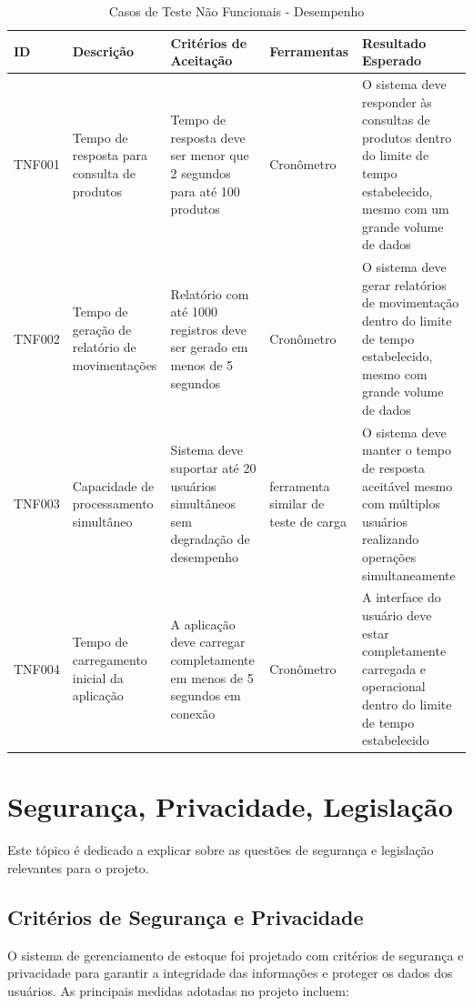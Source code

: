 \documentclass[
	12pt,				%
	openany,			%
	twoside,			%
	a4paper,			%
	english,			%
	brazil				%
	]{abntex2}
\begin{document}
\begin{table}[htbp]
\centering
\caption{Casos de Teste Não Funcionais - Desempenho}
\begin{tabular}{|p{1.3cm}|p{3.3cm}|p{3.5cm}|p{2.5cm}|p{4.5cm}|}
\hline
\textbf{ID} & \textbf{Descrição} & \textbf{Critérios de Aceitação} & \textbf{Ferramentas} & \textbf{Resultado Esperado} \\
\hline
TNF001 & Tempo de resposta para consulta de produtos & Tempo de resposta deve ser menor que 2 segundos para até 100 produtos & Cronômetro & O sistema deve responder às consultas de produtos dentro do limite de tempo estabelecido, mesmo com um grande volume de dados \\
\hline
TNF002 & Tempo de geração de relatório de movimentações & Relatório com até 1000 registros deve ser gerado em menos de 5 segundos & Cronômetro  & O sistema deve gerar relatórios de movimentação dentro do limite de tempo estabelecido, mesmo com grande volume de dados \\
\hline
TNF003 & Capacidade de processamento simultâneo & Sistema deve suportar até 20 usuários simultâneos sem degradação de desempenho &  ferramenta similar de teste de carga & O sistema deve manter o tempo de resposta aceitável mesmo com múltiplos usuários realizando operações simultaneamente \\
\hline
TNF004 & Tempo de carregamento inicial da aplicação & A aplicação deve carregar completamente em menos de 5 segundos em conexão & Cronômetro  & A interface do usuário deve estar completamente carregada e operacional dentro do limite de tempo estabelecido \\
\hline
\end{tabular}
\end{table}



\section{Segurança, Privacidade, Legislação}

Este tópico é dedicado a explicar sobre as questões de segurança e legislação relevantes para o projeto.

\subsection{Critérios de Segurança e Privacidade}

O sistema de gerenciamento de estoque foi projetado com critérios de segurança e privacidade para garantir a integridade das informações e proteger os dados dos usuários. As principais medidas adotadas no projeto incluem:
\end{document}
